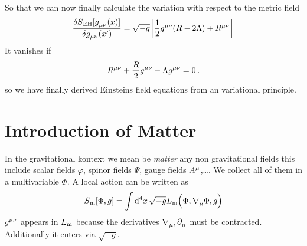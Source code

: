 So that we can now finally calculate the variation with respect to the metric
field
\begin{equation}
\frac{\delta
S\textsubscript{EH}[\tensor{g}{_\mu_\nu}(x)]}{\delta\tensor{g}{_\mu_\nu}(x')}
=\sqrt{-g}\left[\frac{1}{2}\tensor{g}{^\mu^\nu}
(R-2\Lambda)+\tensor{R}{^\mu^\nu}\right]
\end{equation}
It vanishes if 
\begin{equation}
\tensor{R}{^\mu^\nu}+\frac{R}{2}\tensor{g}{^\mu^\nu}
-\Lambda\tensor{g}{^\mu^\nu}=0\, .
\end{equation}
so we have finally derived Einsteins field equations from an variational
principle.
\section{Introduction of Matter}
In the gravitational kontext we mean be \emph{matter} any non gravitational
fields this include scalar fields $\varphi$, spinor fields $\Psi$, gauge fields
$\tensor{A}{^\mu}$,\dots. We collect all of them in a multivariable $\Phi$.
A local action can be written as
\begin{equation}
S\textsubscript{m}[\Phi,g]=\fourint  \sqrt{-g}
L\textsubscript{m}\left(\Phi,\tensor{\nabla}{_\mu}\Phi,g\right)
\end{equation}
$\tensor{g}{^\mu^\nu}$ appears in $L\textsubscript{m}$ because the derivatives
$\tensor{\nabla}{_\mu}, \tensor{\partial}{_\mu}$ must be contracted.
Additionally it enters via $\sqrt{-g}$.
